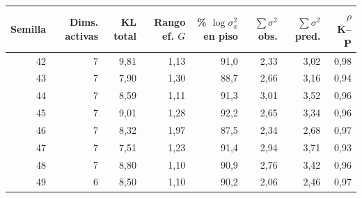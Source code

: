 \begin{tabular}{@{}rrrrrrrr@{}}
\toprule
Semilla & Dims. activas & KL total & Rango ef. $G$ & \% $\log\sigma_x^2$ en piso & $\sum\sigma^2$ obs. & $\sum\sigma^2$ pred. & $\rho$ K--P \\
\midrule
42 & 7 & 9{,}81 & 1{,}13 & 91{,}0 & 2{,}33 & 3{,}02 & 0{,}98 \\
43 & 7 & 7{,}90 & 1{,}30 & 88{,}7 & 2{,}66 & 3{,}16 & 0{,}94 \\
44 & 7 & 8{,}59 & 1{,}11 & 91{,}3 & 3{,}01 & 3{,}52 & 0{,}96 \\
45 & 7 & 9{,}01 & 1{,}28 & 92{,}2 & 2{,}65 & 3{,}34 & 0{,}96 \\
46 & 7 & 8{,}32 & 1{,}97 & 87{,}5 & 2{,}34 & 2{,}68 & 0{,}97 \\
47 & 7 & 7{,}51 & 1{,}23 & 91{,}4 & 2{,}94 & 3{,}71 & 0{,}93 \\
48 & 7 & 8{,}80 & 1{,}10 & 90{,}9 & 2{,}76 & 3{,}42 & 0{,}96 \\
49 & 6 & 8{,}50 & 1{,}10 & 90{,}2 & 2{,}06 & 2{,}46 & 0{,}97 \\
\bottomrule
\end{tabular}
